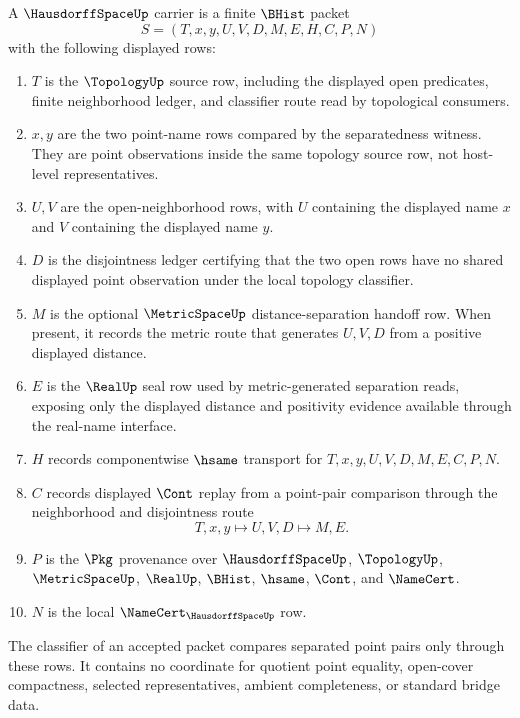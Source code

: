 \begin{definition}
\label{def:hausdorff-space-carrier}
A $\HausdorffSpaceUp$ carrier is a finite $\BHist$ packet
$$
S=(T,x,y,U,V,D,M,E,H,C,P,N)
$$
with the following displayed rows:
\begin{enumerate}
\item $T$ is the $\TopologyUp$ source row, including the displayed open predicates, finite neighborhood ledger, and classifier route read by topological consumers.
\item $x,y$ are the two point-name rows compared by the separatedness witness. They are point observations inside the same topology source row, not host-level representatives.
\item $U,V$ are the open-neighborhood rows, with $U$ containing the displayed name $x$ and $V$ containing the displayed name $y$.
\item $D$ is the disjointness ledger certifying that the two open rows have no shared displayed point observation under the local topology classifier.
\item $M$ is the optional $\MetricSpaceUp$ distance-separation handoff row. When present, it records the metric route that generates $U,V,D$ from a positive displayed distance.
\item $E$ is the $\RealUp$ seal row used by metric-generated separation reads, exposing only the displayed distance and positivity evidence available through the real-name interface.
\item $H$ records componentwise $\hsame$ transport for $T,x,y,U,V,D,M,E,C,P,N$.
\item $C$ records displayed $\Cont$ replay from a point-pair comparison through the neighborhood and disjointness route
$$
T,x,y\longmapsto U,V,D\longmapsto M,E .
$$
\item $P$ is the $\Pkg$ provenance over $\HausdorffSpaceUp$, $\TopologyUp$, $\MetricSpaceUp$, $\RealUp$, $\BHist$, $\hsame$, $\Cont$, and $\NameCert$.
\item $N$ is the local $\NameCert_{\HausdorffSpaceUp}$ row.
\end{enumerate}
The classifier of an accepted packet compares separated point pairs only through these rows. It contains no coordinate for quotient point equality, open-cover compactness, selected representatives, ambient completeness, or standard bridge data.
\end{definition}

